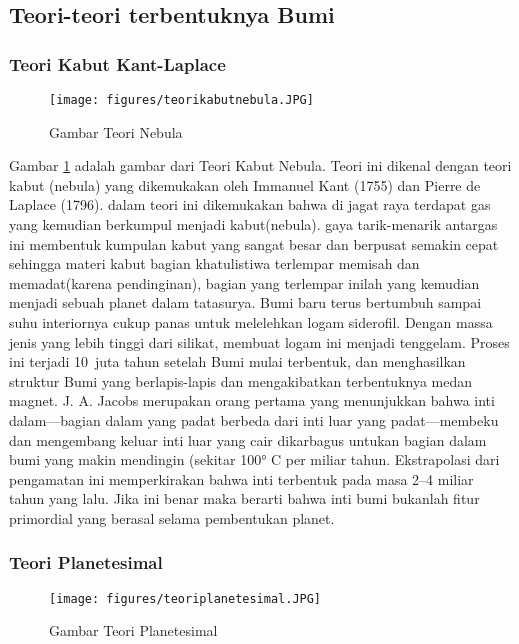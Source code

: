 \subsection{Teori-teori terbentuknya Bumi}
\subsubsection{Teori Kabut Kant-Laplace}
\begin{figure} [ht]
	\centerline{\texttt{[image: figures/teorikabutnebula.JPG]}}
	\caption{Gambar Teori Nebula}
	\label{teorikabutnebula}
	\end{figure}

Gambar \ref{teorikabutnebula} adalah gambar dari Teori Kabut Nebula. Teori ini dikenal dengan teori kabut (nebula) yang dikemukakan oleh Immanuel Kant (1755) dan Pierre de Laplace (1796). dalam teori ini dikemukakan bahwa di jagat raya terdapat gas yang kemudian berkumpul menjadi kabut(nebula). gaya tarik-menarik antargas ini membentuk kumpulan kabut yang sangat besar dan berpusat semakin cepat sehingga materi kabut bagian khatulistiwa terlempar memisah dan memadat(karena pendinginan), bagian yang terlempar inilah yang kemudian menjadi sebuah planet dalam tatasurya. Bumi baru terus bertumbuh sampai suhu interiornya cukup panas untuk melelehkan logam siderofil. Dengan massa jenis yang lebih tinggi dari silikat, membuat logam ini menjadi tenggelam. Proses ini terjadi 10 juta tahun setelah Bumi mulai terbentuk, dan menghasilkan struktur Bumi yang berlapis-lapis dan mengakibatkan terbentuknya medan magnet. J. A. Jacobs merupakan orang pertama yang menunjukkan bahwa inti dalam—bagian dalam yang padat berbeda dari inti luar yang padat—membeku dan mengembang keluar inti luar yang cair dikarbagus untukan bagian dalam bumi yang makin mendingin (sekitar 100° C per miliar tahun. Ekstrapolasi dari pengamatan ini memperkirakan bahwa inti terbentuk pada masa 2–4 miliar tahun yang lalu. Jika ini benar maka berarti bahwa inti bumi bukanlah fitur primordial yang berasal selama pembentukan planet.

\subsubsection{Teori Planetesimal}
\begin{figure} [ht]
	\centerline{\texttt{[image: figures/teoriplanetesimal.JPG]}}
	\caption{Gambar Teori Planetesimal}
	\label{teoriplanetesimal}
	\end{figure}

